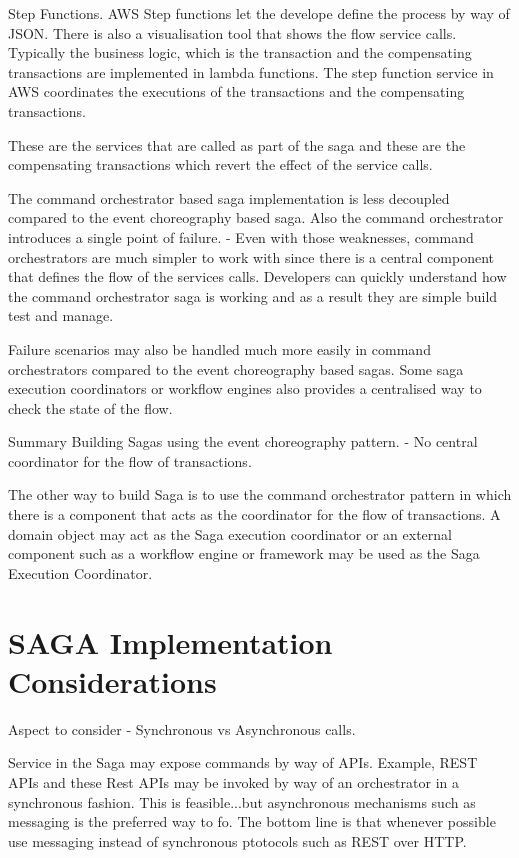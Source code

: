 Step Functions.
AWS Step functions let the develope define the process by way of JSON.
There is also a visualisation tool that shows the flow service calls.
Typically the business logic, which is the transaction and the compensating transactions are implemented in lambda functions.
The step function service in AWS coordinates the executions of the transactions and the compensating transactions.

These are the services that are called as part of the saga and these are the compensating transactions which revert the effect of the service calls.

The command orchestrator based saga implementation is less decoupled compared to the event choreography based saga.
Also the command orchestrator introduces a single point of failure.
- Even with those weaknesses, command orchestrators are much simpler to work with since there is a central component that defines the flow of the services calls.
Developers can quickly understand how the command orchestrator saga is working and as a result they are simple build test and manage.

Failure scenarios may also be handled much more easily in command orchestrators compared to the event choreography based sagas.
Some saga execution coordinators or workflow engines also provides a centralised way to check the state of the flow.

Summary
Building Sagas using the event choreography pattern.
- No central coordinator for the flow of transactions.

The other way to build Saga is to use the command orchestrator pattern in which there is a component that acts as the coordinator for the flow of transactions.
A domain object may act as the Saga execution coordinator or an external component such as a workflow engine or framework may be used as the Saga Execution Coordinator.

\section{SAGA Implementation Considerations}
Aspect to consider - Synchronous vs Asynchronous calls.

Service in the Saga may expose commands by way of APIs. Example, REST APIs and these Rest APIs may be invoked by way of an orchestrator in a synchronous fashion.
This is feasible...but asynchronous mechanisms such as messaging is the preferred way to fo.
The bottom line is that whenever possible use messaging instead of synchronous ptotocols such as REST over HTTP.

